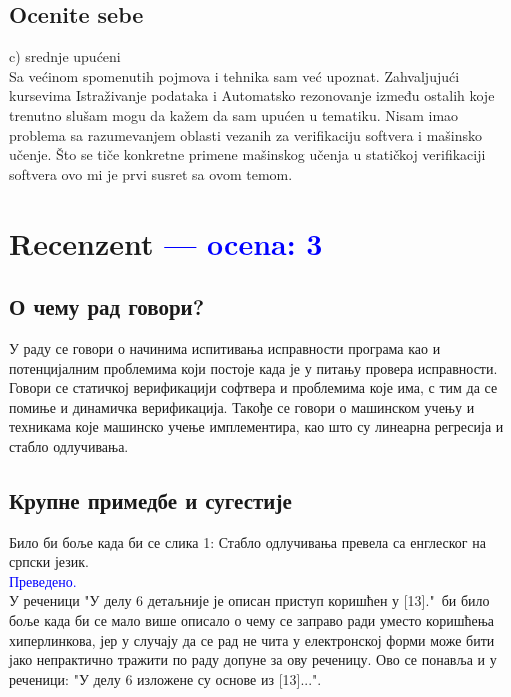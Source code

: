 \documentclass[a4paper]{report}
\newcommand{\odgovor}[1]{\textcolor{blue}{#1}}
\begin{document}
\section{Ocenite sebe}
c) srednje upućeni
\\
Sa većinom spomenutih pojmova i tehnika sam već upoznat. Zahvaljujući kursevima Istraživanje podataka i Automatsko rezonovanje između ostalih koje trenutno slušam mogu da kažem da sam upućen u tematiku. Nisam imao problema sa razumevanjem oblasti vezanih za verifikaciju softvera i mašinsko učenje. Što se tiče konkretne primene mašinskog učenja u statičkoj verifikaciji softvera ovo mi je prvi susret sa ovom temom.

\chapter{Recenzent \odgovor{--- ocena: 3} }


\section{О чему рад говори?}
У раду се говори о начинима испитивања исправности програма као и потенцијалним проблемима који постоје када је у питању провера исправности. Говори се статичкој верификацији софтвера и проблемима које има, с тим да се помиње и динамичка верификација. Такође се говори о машинском учењу и техникама које машинско учење имплементира, као што су линеарна регресија и стабло одлучивања. 

\section{Крупне примедбе и сугестије}
Било би боље када би се слика 1: Стабло одлучивања превела са енглеског на српски језик.
\\

\odgovor{Преведено.}\\

У реченици "У делу 6 детаљније је описан приступ коришћен у [13]."\ би било боље када би се мало више описало о чему се заправо ради уместо коришћења хиперлинкова, јер у случају да се рад не чита у електронској форми може бити јако непрактично тражити по раду допуне за ову реченицу. Ово се понавља и у реченици: "У делу 6 изложене су основе из [13]...".
\end{document}
